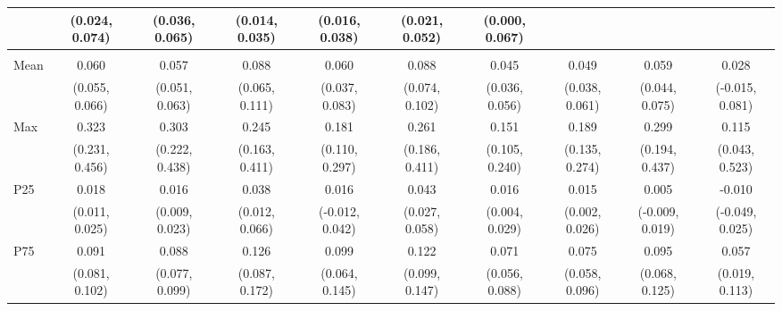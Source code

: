 {\begin{tabular}{l|c|c|c|c|c|c|c|c|c}
& {\scriptsize (0.024, 0.074)}
& {\scriptsize (0.036, 0.065)}
& {\scriptsize (0.014, 0.035)}
& {\scriptsize (0.016, 0.038)}
& {\scriptsize (0.021, 0.052)}
& {\scriptsize (0.000, 0.067)}
\\ [0.1cm]
\hline
\noalign{\smallskip}
\multicolumn{10}{l}{\textbf{Effect with Leads and Lags}} \\
\noalign{\smallskip}
\hline
Mean
& 0.060 & 0.057 & 0.088 & 0.060 & 0.088 & 0.045 & 0.049 & 0.059 & 0.028 \\
& {\scriptsize (0.055, 0.066)}
& {\scriptsize (0.051, 0.063)}
& {\scriptsize (0.065, 0.111)}
& {\scriptsize (0.037, 0.083)}
& {\scriptsize (0.074, 0.102)}
& {\scriptsize (0.036, 0.056)}
& {\scriptsize (0.038, 0.061)}
& {\scriptsize (0.044, 0.075)}
& {\scriptsize (-0.015, 0.081)}
\\ [0.1cm]
\hline
Max
& 0.323 & 0.303 & 0.245 & 0.181 & 0.261 & 0.151 & 0.189 & 0.299 & 0.115 \\
& {\scriptsize (0.231, 0.456)}
& {\scriptsize (0.222, 0.438)}
& {\scriptsize (0.163, 0.411)}
& {\scriptsize (0.110, 0.297)}
& {\scriptsize (0.186, 0.411)}
& {\scriptsize (0.105, 0.240)}
& {\scriptsize (0.135, 0.274)}
& {\scriptsize (0.194, 0.437)}
& {\scriptsize (0.043, 0.523)}
\\ [0.1cm]
\hline
P25
& 0.018 & 0.016 & 0.038 & 0.016 & 0.043 & 0.016 & 0.015 & 0.005 & -0.010 \\
& {\scriptsize (0.011, 0.025)}
& {\scriptsize (0.009, 0.023)}
& {\scriptsize (0.012, 0.066)}
& {\scriptsize (-0.012, 0.042)}
& {\scriptsize (0.027, 0.058)}
& {\scriptsize (0.004, 0.029)}
& {\scriptsize (0.002, 0.026)}
& {\scriptsize (-0.009, 0.019)}
& {\scriptsize (-0.049, 0.025)}
\\ [0.1cm]
\hline
P75
& 0.091 & 0.088 & 0.126 & 0.099 & 0.122 & 0.071 & 0.075 & 0.095 & 0.057 \\
& {\scriptsize (0.081, 0.102)}
& {\scriptsize (0.077, 0.099)}
& {\scriptsize (0.087, 0.172)}
& {\scriptsize (0.064, 0.145)}
& {\scriptsize (0.099, 0.147)}
& {\scriptsize (0.056, 0.088)}
& {\scriptsize (0.058, 0.096)}
& {\scriptsize (0.068, 0.125)}
& {\scriptsize (0.019, 0.113)}
\\ [0.1cm]
\hline
\hline
\end{tabular}
}
